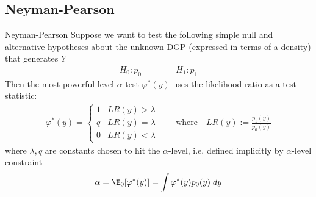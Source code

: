 \documentclass[aspectratio=169, handout]{beamer}
\newcommand{\sumin}{\sum^n_{i=1}}
\begin{document}



\subsection{Neyman-Pearson}

{\footnotesize
\begin{frame}{Neyman-Pearson}
Suppose we want to test the following simple null and alternative
hypotheses about the unknown DGP (expressed in terms of a density) that
generates $Y$
\begin{align*}
  H_0: p_0
  \qquad\qquad
  H_1: p_1
\end{align*}
Then the most powerful level-$\alpha$ test $\varphi^*(y)$ uses the
likelihood ratio as a test statistic:
\begin{align}
  \varphi^*(y)
  =
  \begin{cases}
    1 & LR(y) > \lambda \\
    q & LR(y) = \lambda \\
    0 & LR(y) < \lambda
  \end{cases}
  \qquad \text{where}\quad
  LR(y) := \frac{p_1(y)}{p_0(y)}
  \label{neymantest}
\end{align}
\pause
where $\lambda,q$ are constants chosen to hit the $\alpha$-level, i.e.
defined implicitly by $\alpha$-level constraint
\begin{align}
  \alpha
  = \E_0[\varphi^*(y)]
  = \int \varphi^*(y) p_0(y)\; dy
  \label{neymanalpha}
\end{align}
\end{frame}
}
\end{document}

